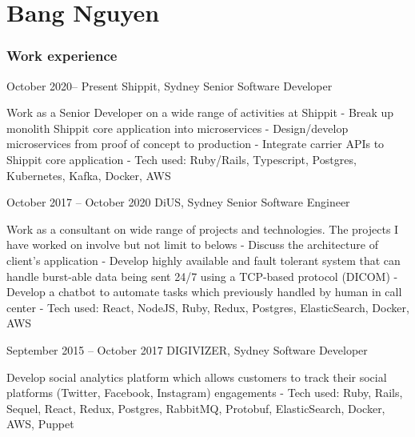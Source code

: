 \documentclass{tccv}
\begin{document}
\part{Bang Nguyen}

\section{Work experience}

\begin{eventlist}

\item{October 2020-- Present}
    {Shippit, Sydney}
    {Senior Software Developer}

    Work as a Senior Developer on a wide range of activities at Shippit
    \newline- Break up monolith Shippit core application into microservices
    \newline- Design/develop microservices from proof of concept to production
    \newline- Integrate carrier APIs to Shippit core application
    \newline- Tech used: Ruby/Rails, Typescript, Postgres, Kubernetes, Kafka, Docker, AWS

\item{October 2017 -- October 2020}
    {DiUS, Sydney}
    {Senior Software Engineer}

    Work as a consultant on wide range of projects and technologies. The projects
    I have worked on involve but not limit to belows
    \newline- Discuss the architecture of client's application
    \newline- Develop highly available and fault tolerant system that can handle
    burst-able data being sent 24/7 using a TCP-based protocol (DICOM)
    \newline- Develop a chatbot to automate tasks which previously handled by
    human in call center
    \newline- Tech used: React, NodeJS, Ruby, Redux, Postgres, ElasticSearch, Docker, AWS

\item{September 2015 -- October 2017}
    {DIGIVIZER, Sydney}
    {Software Developer}

    Develop social analytics platform which allows customers to track their
    social platforms (Twitter, Facebook, Instagram) engagements
    \newline- Tech used: Ruby, Rails, Sequel, React, Redux, Postgres, RabbitMQ,
    Protobuf, ElasticSearch, Docker, AWS, Puppet


\end{eventlist}
\end{document}
